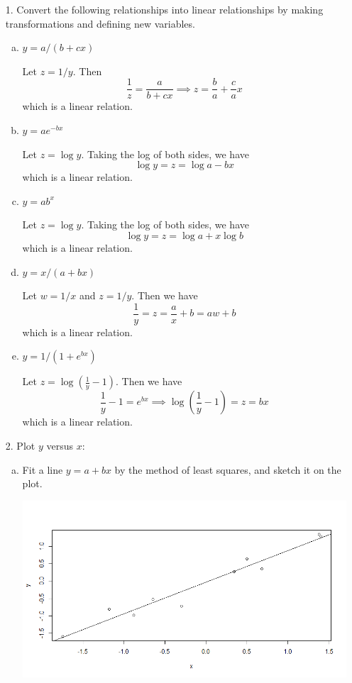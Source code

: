 \documentclass{article}
\begin{document}
\begin{itemize}
	\item[1.] Convert the following relationships into linear relationships by making transformations and defining new variables.
		\begin{enumerate}[a.]
			\item $y=a/(b+cx)$
				\begin{soln}
					Let $z=1/y.$ Then \[\frac{1}{z} = \frac{a}{b+cx} \implies z = \frac{b}{a} + \frac{c}{a}x\] which is a linear relation.
				\end{soln}

			\item $y=ae^{-bx}$
				\begin{soln}
					Let $z=\log y.$ Taking the log of both sides, we have \[\log y = z = \log a - bx\] which is a linear relation.
				\end{soln}

			\item $y=ab^x$
				\begin{soln}
					Let $z=\log y.$ Taking the log of both sides, we have \[\log y = z = \log a+x\log b\] which is a linear relation.
				\end{soln}

			\item $y=x/(a+bx)$
				\begin{soln}
					Let $w=1/x$ and $z=1/y.$ Then we have \[\frac{1}{y} = z = \frac{a}{x} + b = aw + b\] which is a linear relation.
				\end{soln}

			\item $y=1/(1+e^{bx})$
				\begin{soln}
					Let $z=\log\left( \frac{1}{y} - 1 \right).$ Then we have \[\frac{1}{y} - 1 = e^{bx} \implies \log \left( \frac{1}{y} - 1 \right) = z = bx\] which is a linear relation.
				\end{soln}
				
		\end{enumerate}

	\item[2.] Plot $y$ versus $x:$
		\begin{enumerate}[a.]
			\item Fit a line $y=a+bx$ by the method of least squares, and sketch it on the plot.
				\begin{center}
					\includegraphics[width=14cm]{reg_x.png}
				\end{center}
				

\end{enumerate}
\end{itemize}
\end{document}

